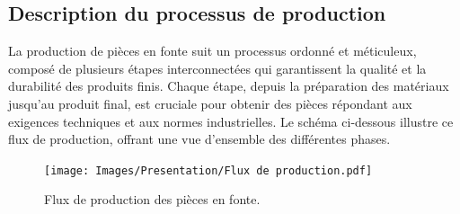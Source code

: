 \documentclass[12pt]{article}
\begin{document}
\newpage

\subsection{Description du processus de production}

La production de pièces en fonte suit un processus ordonné et méticuleux, 
composé de plusieurs étapes interconnectées qui garantissent la qualité 
et la durabilité des produits finis. Chaque étape, depuis la préparation 
des matériaux jusqu'au produit final, est cruciale pour obtenir des pièces 
répondant aux exigences techniques et aux normes industrielles. 
Le schéma ci-dessous illustre ce flux de production, offrant une vue 
d'ensemble des différentes phases. 

\begin{figure}[H]
    \centering
    \begin{adjustbox}{width=1.3\textwidth,height=0.8\textheight,center}
        \texttt{[image: Images/Presentation/Flux de production.pdf]}
    \end{adjustbox}
    \caption{Flux de production des pièces en fonte.}
    \label{fig:flux-production}
\end{figure}
\end{document}
